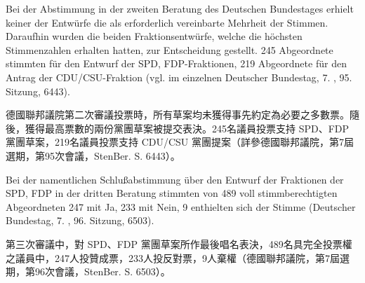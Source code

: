 \documentclass[12pt]{article}
\begin{document}
\begin{transpara}
\end{transpara}

\syncleft
\begin{sourcepara}
Bei der Abstimmung in der zweiten Beratung des Deutschen Bundestages erhielt keiner der Entwürfe die als erforderlich vereinbarte Mehrheit der Stimmen. Daraufhin wurden die beiden Fraktionsentwürfe, welche die höchsten Stimmenzahlen erhalten hatten, zur Entscheidung gestellt. 245 Abgeordnete stimmten für den Entwurf der SPD, FDP-Fraktionen, 219 Abgeordnete für den Antrag der CDU/CSU-Fraktion (vgl. im einzelnen Deutscher Bundestag, 7. \abbrWp{}, 95. Sitzung, \abbrStenBer{} \abbrS{} 6443).
\end{sourcepara}
\begin{transpara}
德國聯邦議院第二次審議投票時，所有草案均未獲得事先約定為必要之多數票。隨後，獲得最高票數的兩份黨團草案被提交表決。245名議員投票支持 SPD、FDP 黨團草案，219名議員投票支持 CDU/CSU 黨團提案（詳參德國聯邦議院，第7屆選期，第95次會議，StenBer. S. 6443）。
\end{transpara}

\syncleft
\begin{sourcepara}
Bei der namentlichen Schlußabstimmung über den Entwurf der Fraktionen der SPD, FDP in der dritten Beratung stimmten von 489 voll stimmberechtigten Abgeordneten 247 mit Ja, 233 mit Nein, 9 enthielten sich der Stimme (Deutscher Bundestag, 7. \abbrWp{}, 96. Sitzung, \abbrStenBer{} \abbrS{} 6503).
\end{sourcepara}
\begin{transpara}
第三次審議中，對 SPD、FDP 黨團草案所作最後唱名表決，489名具完全投票權之議員中，247人投贊成票，233人投反對票，9人棄權（德國聯邦議院，第7屆選期，第96次會議，StenBer. S. 6503）。
\end{transpara}
\end{document}
